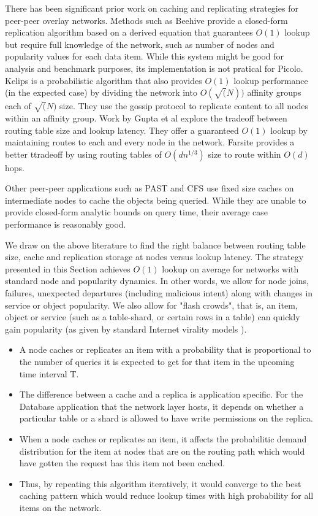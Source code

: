 There has been significant prior work on caching and replicating strategies for peer-peer overlay networks. Methods such
as Beehive \cite{beehive} provide a closed-form replication algorithm based on a derived equation that guarantees
\(O(1)\) lookup but require full knowledge of the network, such as number of nodes and popularity values for each data
item. While this system might be good for analysis and benchmark purposes, its implementation is not pratical for
Picolo. Kelips \cite{kelips} is a probabilistic algorithm that also provides \(O(1)\) lookup performance (in the
expected case) by dividing the network into \(O(\sqrt(N))\) affinity groups each of \(\sqrt(N)\) size. They use the
gossip protocol to replicate content to all nodes within an affinity group. Work by Gupta et al \cite{one_hop_lookup}
explore the tradeoff between routing table size and lookup latency. They offer a guaranteed \(O(1)\) lookup by
maintaining routes to each and every node in the network. Farsite \cite{farsite} provides a better ttradeoff by using
routing tables of \(O(dn^{1/3})\) size to route within \(O(d)\) hops.

Other peer-peer applications such as PAST \cite{past} and CFS \cite{cfs} use fixed size caches on intermediate nodes to
cache the objects being queried. While they are unable to provide closed-form analytic bounds on query time, their
average case performance is reasonably good.

We draw on the above literature to find the right balance between routing table size, cache and replication storage at
nodes versus lookup latency. The strategy presented in this Section achieves \(O(1)\) lookup on average for networks
with standard node and popularity dynamics. In other words, we allow for node joins, failures, unexpected departures
(including malicious intent) along with changes in service or object popularity. We also allow for "flash crowds", that
is, an item, object or service (such as a table-shard, or certain rows in a table) can quickly gain popularity (as given
by standard Internet virality models \cite{virality_model}).

\begin{itemize}
    \item A node caches or replicates an item with a probability that is proportional to the number of queries it is
        expected to get for that item in the upcoming time interval T.
    \item The difference between a cache and a replica is application specific. For the Database application that the
        network layer hosts, it depends on whether a particular table or a shard is allowed to have write permissions on
        the replica.
    \item When a node caches or replicates an item, it affects the probabilitic demand distribution for the item at
        nodes that are on the routing path which would have gotten the request has this item not been cached.
    \item Thus, by repeating this algorithm iteratively, it would converge to the best caching pattern which would reduce
        lookup times with high probability for all items on the network.
\end{itemize}

